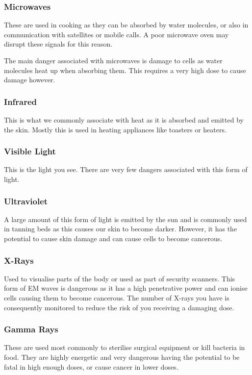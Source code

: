 \documentclass[11pt, titlepage]{article}
\begin{document}
\subsubsection*{Microwaves}
These are used in cooking as they can be absorbed by water molecules, or also in communication with satellites or mobile calls.  A poor microwave oven may disrupt these signals for this reason.  

The main danger associated with microwaves is damage to cells as water molecules heat up when absorbing them.  This requires a very high dose to cause damage however.

\subsubsection*{Infrared}
This is what we commonly associate with heat as it is absorbed and emitted by the skin.  Mostly this is used in heating appliances like toasters or heaters.

\subsubsection*{Visible Light}
This is the light you see.  There are very few dangers associated with this form of light.

\subsubsection*{Ultraviolet}
A large amount of this form of light is emitted by the sun and is commonly used in tanning beds as this causes our skin to become darker.  However, it has the potential to cause skin damage and can cause cells to become cancerous.

\subsubsection*{X-Rays}
Used to visualise parts of the body or used as part of security scanners.  This form of EM waves is dangerous as it has a high penetrative power and can ionise cells causing them to become cancerous.  The number of X-rays you have is consequently monitored to reduce the risk of you receiving a damaging dose.

\subsubsection*{Gamma Rays}
These are used most commonly to sterilise surgical equipment or kill bacteria in food.  They are highly energetic and very dangerous having the potential to be fatal in high enough doses, or cause cancer in lower doses.
\end{document}
